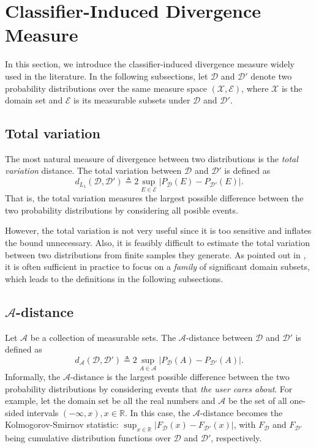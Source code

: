 \section{Classifier-Induced Divergence Measure}\label{sect:divergence}
In this section, we introduce the classifier-induced divergence measure widely used in the literature. In the following subsections, let $\mathcal{D}$ and $\mathcal{D}'$ denote two probability distributions over the same measure space $(\mathcal{X}, \mathcal{E})$, where $\mathcal{X}$ is the domain set and $\mathcal{E}$ is its measurable subsets under $\mathcal{D}$ and $\mathcal{D}'$.

\subsection{Total variation}
The most natural measure of divergence between two distributions is the \textit{total variation} distance. The total variation between $\mathcal{D}$ and $\mathcal{D}'$ is defined as
\begin{equation}\label{eq:total_var}
  d_{L_1}(\mathcal{D}, \mathcal{D}') \triangleq 2\sup_{E \in \mathcal{E}} \vert P_{\mathcal{D}}(E)-P_{\mathcal{D}'}(E) \vert.
\end{equation}
That is, the total variation measures the largest possible difference between the two probability distributions by considering all posible events.

However, the total variation is not very useful since it is too sensitive and inflates the bound unnecessary. Also, it is feasibly difficult to estimate the total variation between two distributions from finite samples they generate. As pointed out in \cite{Kifer2004}, it is often sufficient in practice to focus on a \textit{family} of significant domain subsets, which leads to the definitions in the following subsections.

\subsection{$\mathcal{A}$-distance}
Let $\mathcal{A}$ be a collection of measurable sets. The $\mathcal{A}$-distance between $\mathcal{D}$ and $\mathcal{D}'$ is defined as
\begin{equation}\label{eq:a_distance}
  d_{\mathcal{A}}(\mathcal{D}, \mathcal{D}') \triangleq 2\sup_{A \in \mathcal{A}} \vert P_{\mathcal{D}}(A)-P_{\mathcal{D}'}(A) \vert.
\end{equation}
Informally, the $\mathcal{A}$-distance is the largest possible difference between the two probability distributions by considering events that \textit{the user cares about}. For example, let the domain set be all the real numbers and $\mathcal{A}$ be the set of all one-sided intervals $(-\infty,x), x \in \mathbb{R}$. In this case, the $\mathcal{A}$-distance becomes the Kolmogorov-Smirnov statistic: $\sup_{x \in \mathbb{R}} \vert F_{\mathcal{D}}(x)-F_{\mathcal{D}'}(x) \vert$, with $F_{\mathcal{D}}$ and $F_{\mathcal{D'}}$ being cumulative distribution functions over $\mathcal{D}$ and $\mathcal{D}'$, respectively.

